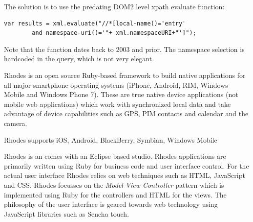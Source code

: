 \noindent The solution is to use the predating DOM2 level xpath evaluate function:
\begin{verbatim}
var results = xml.evaluate("//*[local-name()='entry' 
		and namespace-uri()='"+ xml.namespaceURI+"']");
\end{verbatim}
Note that the function dates back to 2003 and prior. The namespace selection is hardcoded in the query, which is not very elegant.


Rhodes is an open source Ruby-based framework to build native applications for all major smartphone operating systems (iPhone, Android, RIM, Windows Mobile and Windows Phone 7). These are true native device applications (not mobile web applications) which work with synchronized local data and take advantage of device capabilities such as GPS, PIM contacts and calendar and the camera. %


Rhodes supports iOS, Android, BlackBerry, Symbian, Windows Mobile

Rhodes is an comes with an Eclipse based studio. Rhodes applications are primarily written using Ruby for business code and user interface control. For the actual user interface Rhodes relies on web techniques such as HTML, JavaScript and CSS. 
Rhodes focusses on the \emph{Model-View-Controller} pattern which is implemented using Ruby for the controllers and HTML for the views. The philosophy of the user interface is geared towards web technology using JavaScript libraries such as Sencha touch.

